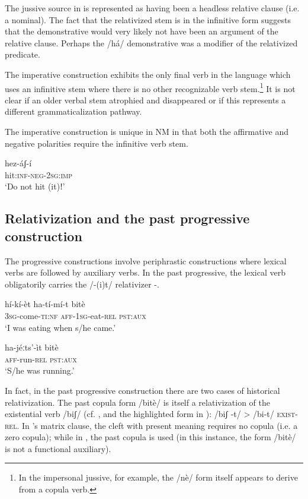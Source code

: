 \documentclass[output=paper]{langsci/langscibook}
\begin{document}
The jussive source in  is represented as having been a headless relative clause (i.e. a nominal). The fact that the relativized stem is in the infinitive form suggests that the demonstrative would very likely not have been an argument of the relative clause. Perhaps the /há/ demonstrative was a modifier of the relativized predicate.

The imperative construction exhibits the only final verb in the language which uses an infinitive stem where there is no other recognizable verb stem.\footnote{ In the impersonal jussive, for example, the /nè/ form itself appears to derive from a copula verb.} It is not clear if an older verbal stem atrophied and disappeared or if this represents a different grammaticalization pathway. 

The imperative construction  is unique in NM in that both the affirmative and negative polarities require the infinitive verb stem.  

\ea\label{ex:mahland:66}
\gll hez-áʃ-í\\
hit:\textsc{inf-neg-2sg:imp}\\
\glt `Do not hit (it)ǃ'
\z

\subsection{Relativization and the past progressive construction}\label{sec:mahland:3.2}

The progressive constructions involve periphrastic constructions where lexical verbs are followed by auxiliary verbs. In the past progressive, the lexical verb obligatorily carries the /-(i)t/ relativizer -.

\ea\label{ex:mahland:67}
\gll hí-kí-èt                 ha-tí-mí-t          bitè\\
\textsc{3sg}{}-come-\textsc{ti:nf}   \textsc{aff-1sg}{}-eat-\textsc{rel}   \textsc{pst:aux} \\
\glt `I was eating when s/he came.'
\z

\ea\label{ex:mahland:68}
\gll ha-jéːts'-ìt    bitè\\
\textsc{aff}{}-run-\textsc{rel}   \textsc{pst:aux}\\
\glt `S/he was running.'
\z

In fact, in the past progressive construction there are two cases of historical relativization. The past copula form /bitè/ is itself a relativization of the existential verb /biʃ/ (cf. \citealt[318; 461-462]{Ahland2012}, and the highlighted form in ): /biʃ -t/ {>} /bi-t/ \textsc{exist-rel}. In 's matrix clause, the cleft with present meaning requires no copula (i.e. a zero copula); while in , the past copula is used (in this instance, the form /bitè/ is not a functional auxiliary). 
\end{document}
